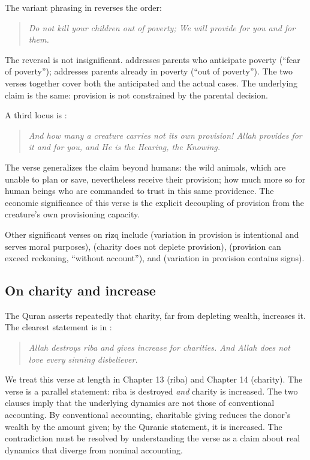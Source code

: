 The variant phrasing in  reverses the order:

\begin{quote}
\textit{Do not kill your children out of poverty; We will provide
for you and for them.}
\end{quote}

The reversal is not insignificant.  addresses parents
who anticipate poverty (``fear of poverty'');  addresses
parents already in poverty (``out of poverty''). The two verses
together cover both the anticipated and the actual cases. The
underlying claim is the same: provision is not constrained by the
parental decision.

A third locus is :

\begin{quote}
\textit{And how many a creature carries not its own provision! Allah
provides for it and for you, and He is the Hearing, the Knowing.}
\end{quote}

The verse generalizes the claim beyond humans: the wild animals,
which are unable to plan or save, nevertheless receive their
provision; how much more so for human beings who are commanded to
trust in this same providence. The economic significance of this
verse is the explicit decoupling of provision from the creature's
own provisioning capacity.

Other significant verses on rizq include  (variation in
provision is intentional and serves moral purposes), 
(charity does not deplete provision),  (provision can
exceed reckoning, ``without account''), and  (variation
in provision contains signs).

\subsection{On charity and increase}

The Quran asserts repeatedly that charity, far from depleting wealth,
increases it. The clearest statement is in :

\begin{quote}
\textit{Allah destroys riba and gives increase for charities. And
Allah does not love every sinning disbeliever.}
\end{quote}

We treat this verse at length in Chapter 13 (riba) and Chapter 14
(charity). The verse is a parallel statement: riba is destroyed
\emph{and} charity is increased. The two clauses imply that the
underlying dynamics are not those of conventional accounting. By
conventional accounting, charitable giving reduces the donor's wealth
by the amount given; by the Quranic statement, it is increased. The
contradiction must be resolved by understanding the verse as a claim
about real dynamics that diverge from nominal accounting.

